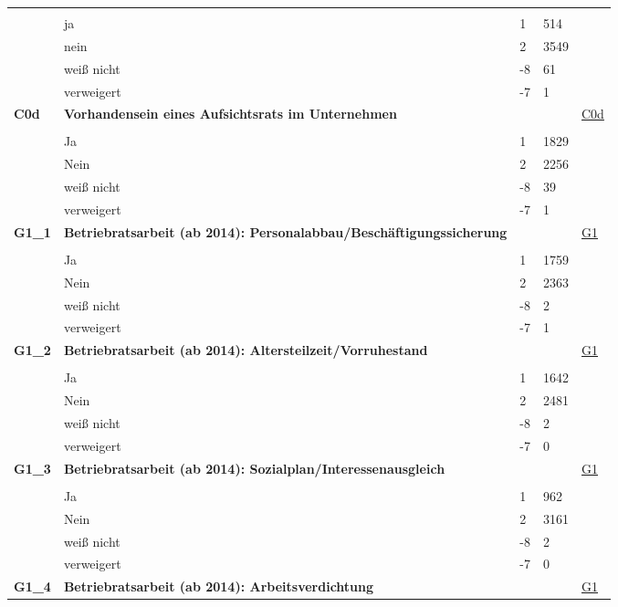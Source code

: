 \begin{longtable}{| L{2.5cm} | L{8.25cm}| C{1.5cm} | R{1.25cm} | C{2.25cm} |  }
   &  &  &  &  \\ 
   & ja & 1 & 514 &  \\ 
   & nein & 2 & 3549 &  \\ 
   & weiß nicht & -8 & 61 &  \\ 
   & verweigert & -7 & 1 &  \\ 
   \midrule
\textbf{C0d}\label{var:suf:C0d} & \textbf{Vorhandensein eines Aufsichtsrats im Unternehmen} &  &  & \hyperref[C0d]{C0d} \\ 
   &  &  &  &  \\ 
   & Ja & 1 & 1829 &  \\ 
   & Nein & 2 & 2256 &  \\ 
   & weiß nicht & -8 & 39 &  \\ 
   & verweigert & -7 & 1 &  \\ 
   \midrule
\textbf{G1\_1}\label{var:suf:G1:1} & \textbf{Betriebratsarbeit (ab 2014): Personalabbau/Beschäftigungssicherung} &  &  & \hyperref[G1]{G1} \\ 
   &  &  &  &  \\ 
   & Ja & 1 & 1759 &  \\ 
   & Nein & 2 & 2363 &  \\ 
   & weiß nicht & -8 & 2 &  \\ 
   & verweigert & -7 & 1 &  \\ 
   \midrule
\textbf{G1\_2}\label{var:suf:G1:2} & \textbf{Betriebratsarbeit (ab 2014): Altersteilzeit/Vorruhestand} &  &  & \hyperref[G1]{G1} \\ 
   &  &  &  &  \\ 
   & Ja & 1 & 1642 &  \\ 
   & Nein & 2 & 2481 &  \\ 
   & weiß nicht & -8 & 2 &  \\ 
   & verweigert & -7 & 0 &  \\ 
   \midrule
\textbf{G1\_3}\label{var:suf:G1:3} & \textbf{Betriebratsarbeit (ab 2014): Sozialplan/Interessenausgleich} &  &  & \hyperref[G1]{G1} \\ 
   &  &  &  &  \\ 
   & Ja & 1 & 962 &  \\ 
   & Nein & 2 & 3161 &  \\ 
   & weiß nicht & -8 & 2 &  \\ 
   & verweigert & -7 & 0 &  \\ 
   \midrule
\textbf{G1\_4}\label{var:suf:G1:4} & \textbf{Betriebratsarbeit (ab 2014): Arbeitsverdichtung} &  &  & \hyperref[G1]{G1} \\ 

\end{longtable}
